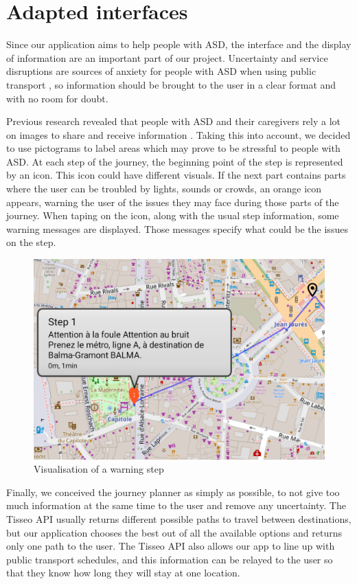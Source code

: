 \section{Adapted interfaces}

Since our application aims to help people with ASD, the interface and the display of information are an important part of our project. Uncertainty and service disruptions are sources of anxiety for people with ASD when using public transport \cite{2020ExperiencesYoungAutistic}, so information should be brought to the user in a clear format and with no room for doubt.\newline

Previous research revealed that people with ASD and their caregivers rely a lot on images to share and receive information \cite{2018MobilityPoliciesExtraSmall}. Taking this into account, we decided to use pictograms to label areas which may prove to be stressful to people with ASD. At each step of the journey, the beginning point of the step is represented by an icon. This icon could have different visuals. If the next part contains parts where the user can be troubled by lights, sounds or crowds, an orange icon appears, warning the user of the issues they may face during those parts of the journey. When taping on the icon, along with the usual step information, some warning messages are displayed. Those messages specify what could be the issues on the step.\newline 

\begin{figure}[h]
    \centering
    \includegraphics[scale=0.3]{img/step warning.png}
    \caption{Visualisation of a warning step}
    \label{fig:WarningStep}
\end{figure}

Finally, we conceived the journey planner as simply as possible, to not give too much information at the same time to the user and remove any uncertainty. The Tisseo API usually returns different possible paths to travel between destinations, but our application chooses the best out of all the available options and returns only one path to the user. The Tisseo API also allows our app to line up with public transport schedules, and this information can be relayed to the user so that they know how long they will stay at one location.
